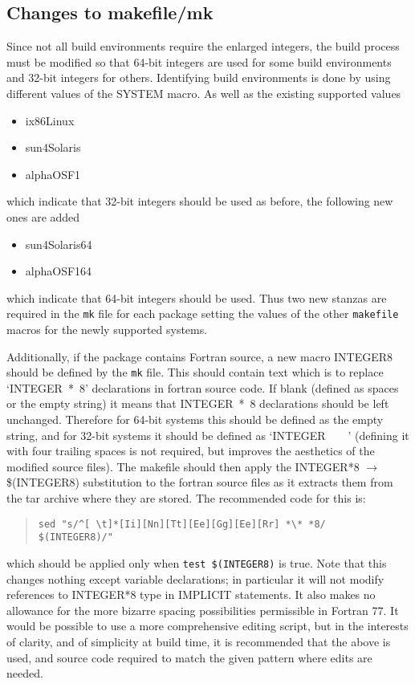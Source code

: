 \documentclass[twoside,11pt]{article}
\newcommand{\latexhtml}[2]{#1}
\renewcommand{\_}{\texttt{\symbol{95}}}
\newcommand{\file}[1]{{\tt #1}}
\newenvironment{squote}{\begin{quote}\begin{small}}{\end{small}\end{quote}}
\begin{document}
\subsection{Changes to makefile/mk\label{sec:makefile}}

Since not all build environments require the enlarged integers,
the build process must be modified so that 64-bit integers are
used for some build environments and 32-bit integers for others.
Identifying build environments is done by using different values
of the SYSTEM macro.  As well as the existing supported values
\begin{itemize}
\item ix86\_Linux
\item sun4\_Solaris
\item alpha\_OSF1
\end{itemize}
which indicate that 32-bit integers should be used as before,
the following new ones are added
\begin{itemize}
\item sun4\_Solaris\_64
\item alpha\_OSF1\_64
\end{itemize}
which indicate that 64-bit integers should be used.
Thus two new stanzas are required in the \file{mk} file for each package
setting the values of the other \file{makefile} macros for the newly
supported systems.

Additionally, if the package contains Fortran source,
a new macro INTEGER8 should be
defined by the \file{mk} file.  This should contain text which is to
replace `INTEGER~*~8' declarations in fortran source code.
If blank (defined as spaces or the empty string) it means
that INTEGER~*~8 declarations should be left unchanged.
Therefore for 64-bit systems this should be defined as the empty
string, and for 32-bit systems it should be defined as `INTEGER~~~~'
(defining it with four trailing spaces
is not required, but improves the aesthetics of
the modified source files).
The makefile should then apply the
INTEGER*8 \latexhtml{$\rightarrow$}{->} \$(INTEGER8)
substitution to the fortran source files as it extracts them from the
tar archive where they are stored.
The recommended code for this is:
\begin{squote}
\begin{verbatim}
sed "s/^[ \t]*[Ii][Nn][Tt][Ee][Gg][Ee][Rr] *\* *8/      $(INTEGER8)/"
\end{verbatim}
\end{squote}
which should be applied only when {\tt test \$(INTEGER8)} is true.
Note that this changes nothing except variable declarations;
in particular it will not modify references to INTEGER*8 type in IMPLICIT
statements.
It also makes no allowance for the more bizarre spacing possibilities
permissible in Fortran 77.
It would be possible to use a more comprehensive editing script,
but in the interests of clarity, and of simplicity at build time,
it is recommended that the above is used,
and source code required to match the given pattern where edits
are needed.
\end{document}
